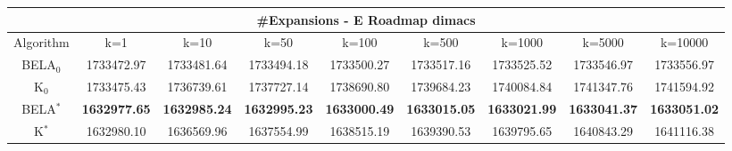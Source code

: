 \begin{tabular}{c|cccccccc}\toprule
\multicolumn{9}{c}{#Expansions - E Roadmap dimacs}\\ \midrule
Algorithm & k=1 & k=10 & k=50 & k=100 & k=500 & k=1000 & k=5000 & k=10000 \\ \midrule
BELA$_0$ & 1733472.97 & 1733481.64 & 1733494.18 & 1733500.27 & 1733517.16 & 1733525.52 & 1733546.97 & 1733556.97 \\
K$_0$ & 1733475.43 & 1736739.61 & 1737727.14 & 1738690.80 & 1739684.23 & 1740084.84 & 1741347.76 & 1741594.92 \\
BELA$^*$ & \textbf{1632977.65} & \textbf{1632985.24} & \textbf{1632995.23} & \textbf{1633000.49} & \textbf{1633015.05} & \textbf{1633021.99} & \textbf{1633041.37} & \textbf{1633051.02} \\
K$^*$ & 1632980.10 & 1636569.96 & 1637554.99 & 1638515.19 & 1639390.53 & 1639795.65 & 1640843.29 & 1641116.38 \\ \bottomrule 
\end{tabular}
